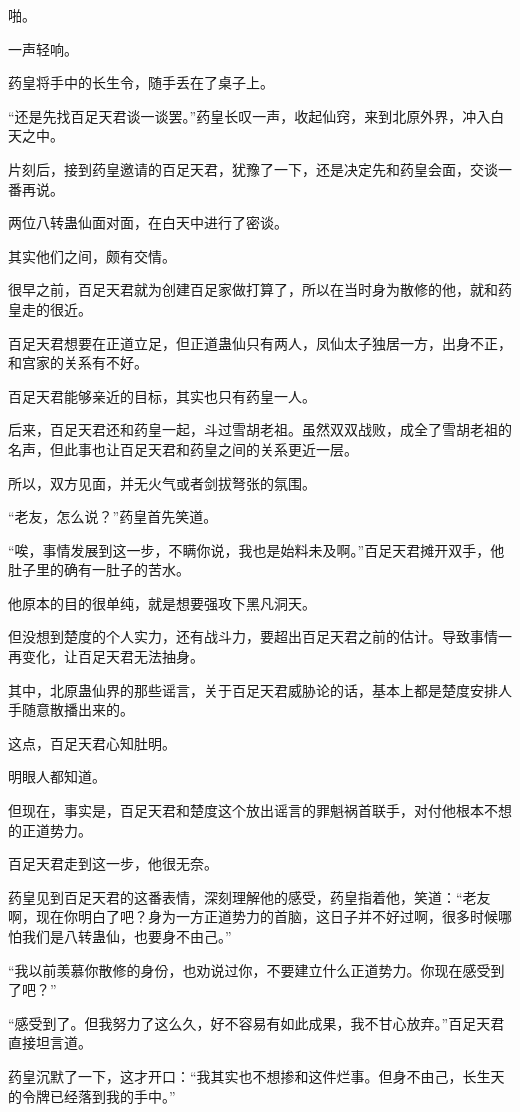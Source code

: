 \begin{this_body}
啪。

一声轻响。

药皇将手中的长生令，随手丢在了桌子上。

“还是先找百足天君谈一谈罢。”药皇长叹一声，收起仙窍，来到北原外界，冲入白天之中。

片刻后，接到药皇邀请的百足天君，犹豫了一下，还是决定先和药皇会面，交谈一番再说。

两位八转蛊仙面对面，在白天中进行了密谈。

其实他们之间，颇有交情。

很早之前，百足天君就为创建百足家做打算了，所以在当时身为散修的他，就和药皇走的很近。

百足天君想要在正道立足，但正道蛊仙只有两人，凤仙太子独居一方，出身不正，和宫家的关系有不好。

百足天君能够亲近的目标，其实也只有药皇一人。

后来，百足天君还和药皇一起，斗过雪胡老祖。虽然双双战败，成全了雪胡老祖的名声，但此事也让百足天君和药皇之间的关系更近一层。

所以，双方见面，并无火气或者剑拔弩张的氛围。

“老友，怎么说？”药皇首先笑道。

“唉，事情发展到这一步，不瞒你说，我也是始料未及啊。”百足天君摊开双手，他肚子里的确有一肚子的苦水。

他原本的目的很单纯，就是想要强攻下黑凡洞天。

但没想到楚度的个人实力，还有战斗力，要超出百足天君之前的估计。导致事情一再变化，让百足天君无法抽身。

其中，北原蛊仙界的那些谣言，关于百足天君威胁论的话，基本上都是楚度安排人手随意散播出来的。

这点，百足天君心知肚明。

明眼人都知道。

但现在，事实是，百足天君和楚度这个放出谣言的罪魁祸首联手，对付他根本不想的正道势力。

百足天君走到这一步，他很无奈。

药皇见到百足天君的这番表情，深刻理解他的感受，药皇指着他，笑道：“老友啊，现在你明白了吧？身为一方正道势力的首脑，这日子并不好过啊，很多时候哪怕我们是八转蛊仙，也要身不由己。”

“我以前羡慕你散修的身份，也劝说过你，不要建立什么正道势力。你现在感受到了吧？”

“感受到了。但我努力了这么久，好不容易有如此成果，我不甘心放弃。”百足天君直接坦言道。

药皇沉默了一下，这才开口：“我其实也不想掺和这件烂事。但身不由己，长生天的令牌已经落到我的手中。”


\end{this_body}
